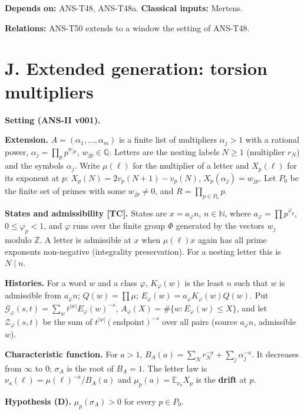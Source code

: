 \documentclass[
  11pt,
]{article}
\begin{document}
\textbf{Depends on:} ANS-T48, ANS-T48a. \textbf{Classical inputs:}
Mertens.

\textbf{Relations:} ANS-T50 extends to a window the setting of ANS-T48.

\hypertarget{j.-extended-generation-torsion-multipliers}{%
\section{J. Extended generation: torsion
multipliers}\label{j.-extended-generation-torsion-multipliers}}

\textbf{Setting (ANS-II v001).}

\textbf{Extension.} \(A=(\alpha_1,\dots,\alpha_m)\) is a finite list of
multipliers \(\alpha_j>1\) with a rational power,
\(\alpha_j=\prod_pp^{w_{jp}}\), \(w_{jp}\in\mathbb Q\). Letters are the
nesting labels \(N\ge1\) (multiplier \(r_N\)) and the symbols
\(\alpha_j\). Write \(\mu(\ell)\) for the multiplier of a letter and
\(X_p(\ell)\) for its exponent at \(p\): \(X_p(N)=2v_p(N+1)-v_p(N)\),
\(X_p(\alpha_j)=w_{jp}\). Let \(P_0\) be the finite set of primes with
some \(w_{jp}\ne0\), and \(R=\prod_{p\in P_0}p\).

\textbf{States and admissibility {[}TC{]}.} States are
\(x=a_\varphi n\), \(n\in\mathbb N\), where
\(a_\varphi=\prod p^{\varphi_p}\), \(0\le\varphi_p<1\), and \(\varphi\)
runs over the finite group \(\Phi\) generated by the vectors \(w_j\)
modulo \(\mathbb Z\). A letter is admissible at \(x\) when
\(\mu(\ell)x\) again has all prime exponents non-negative (integrality
preservation). For a nesting letter this is \(N\mid n\).

\textbf{Histories.} For a word \(w\) and a class \(\varphi\),
\(K_\varphi(w)\) is the least \(n\) such that \(w\) is admissible from
\(a_\varphi n\); \(Q(w)=\prod\mu\);
\(E_\varphi(w)=a_\varphi K_\varphi(w)Q(w)\). Put
\(\mathcal G_\varphi(s,t)=\sum_wt^{|w|}E_\varphi(w)^{-s}\),
\(A_\varphi(X)=\#\{w:E_\varphi(w)\le X\}\), and let
\(\mathcal Z_\varphi(s,t)\) be the sum of
\(t^{|w|}(\text{endpoint})^{-s}\) over all pairs (source
\(a_\varphi n\), admissible \(w\)).

\textbf{Characteristic function.} For \(a>1\),
\(B_A(a)=\sum_N r_N^{-a}+\sum_j\alpha_j^{-a}\). It decreases from
\(\infty\) to \(0\); \(\sigma_A\) is the root of \(B_A=1\). The letter
law is \(\nu_a(\ell)=\mu(\ell)^{-a}/B_A(a)\) and
\(\mu_p(a)=\mathbb E_{\nu_a}X_p\) is the \textbf{drift} at \(p\).

\textbf{Hypothesis (D).} \(\mu_p(\sigma_A)>0\) for every \(p\in P_0\).
\end{document}

